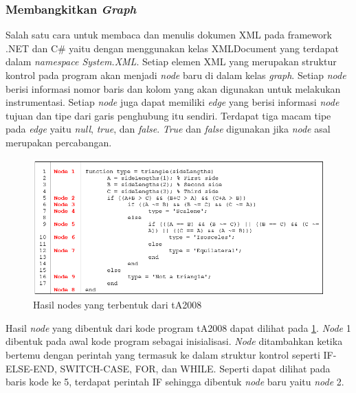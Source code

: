 \subsubsection*{Membangkitkan \textit{Graph}}
Salah satu cara untuk membaca dan menulis dokumen XML pada framework .NET dan C\# yaitu dengan menggunakan kelas XMLDocument yang terdapat dalam \textit{namespace System.XML}. Setiap elemen XML yang merupakan struktur kontrol pada program akan menjadi \textit{node} baru di dalam kelas \textit{graph}. Setiap \textit{node} berisi informasi nomor baris dan kolom yang akan digunakan untuk melakukan instrumentasi. Setiap \textit{node} juga dapat memiliki \textit{edge} yang berisi informasi \textit{node} tujuan dan tipe dari garis penghubung itu sendiri. Terdapat tiga macam tipe pada \textit{edge} yaitu \textit{null}, \textit{true}, dan \textit{false}. \textit{True} dan \textit{false} digunakan jika \textit{node} asal merupakan percabangan.
\begin{figure}
	\centering
	\includegraphics[width=0.9\linewidth]{"gambar/hasil node"}
	\caption{Hasil nodes yang terbentuk dari tA2008}
	\label{fig:hasil-node}
\end{figure}
Hasil \textit{node} yang dibentuk dari kode program tA2008 dapat dilihat pada \ref{fig:hasil-node}. \textit{Node} 1 dibentuk pada awal kode program sebagai inisialisasi. \textit{Node} ditambahkan ketika bertemu dengan perintah yang termasuk ke dalam struktur kontrol seperti IF-ELSE-END, SWITCH-CASE, FOR, dan WHILE. Seperti dapat dilihat pada baris kode ke 5, terdapat perintah IF sehingga dibentuk \textit{node} baru yaitu \textit{node} 2. 


